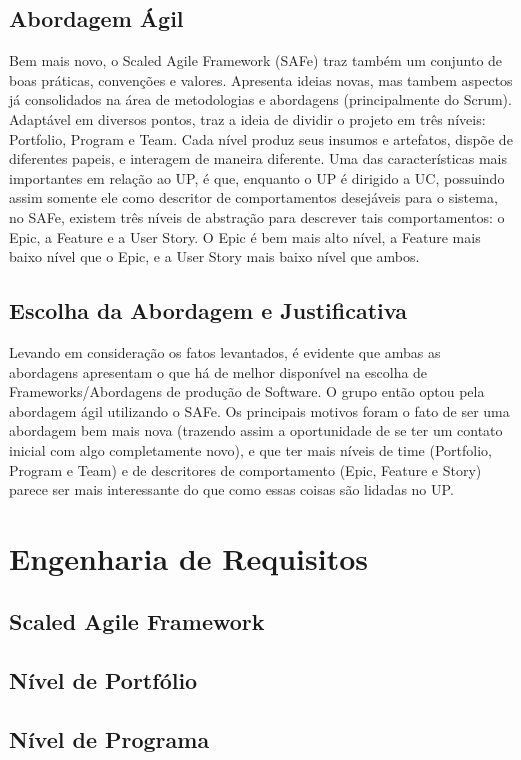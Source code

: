\section{Abordagem Ágil}
Bem mais novo, o Scaled Agile Framework (SAFe) traz também um conjunto de boas práticas, convenções e valores. Apresenta ideias novas, mas tambem aspectos já consolidados na área de metodologias e abordagens (principalmente do Scrum).
Adaptável em diversos pontos, traz a ideia de dividir o projeto em três níveis: Portfolio, Program e Team. Cada nível produz seus insumos e artefatos, dispõe de diferentes papeis, e interagem de maneira diferente.
Uma das características mais importantes em relação ao UP, é que, enquanto o UP é dirigido a UC, possuindo assim somente ele como descritor de comportamentos desejáveis para o sistema, no SAFe, existem três níveis de abstração para descrever tais comportamentos: o Epic, a Feature e a User Story. O Epic é bem mais alto nível, a Feature mais baixo nível que o Epic, e a User Story mais baixo nível que ambos.

\section{Escolha da Abordagem e Justificativa}
Levando em consideração os fatos levantados, é evidente que ambas as abordagens apresentam o que há de melhor disponível na escolha de Frameworks/Abordagens de produção de Software. O grupo então optou pela abordagem ágil utilizando o SAFe.
Os principais motivos foram o fato de ser uma abordagem bem mais nova (trazendo assim a oportunidade de se ter um contato inicial com algo completamente novo), e que ter mais níveis de time (Portfolio, Program e Team) e de descritores de comportamento (Epic, Feature e Story) parece ser mais interessante do que como essas coisas são lidadas no UP.

\chapter[Engenharia de Requisitos]{Engenharia de Requisitos}

\section{Scaled Agile Framework}
\section{Nível de Portfólio}
\section{Nível de Programa}
